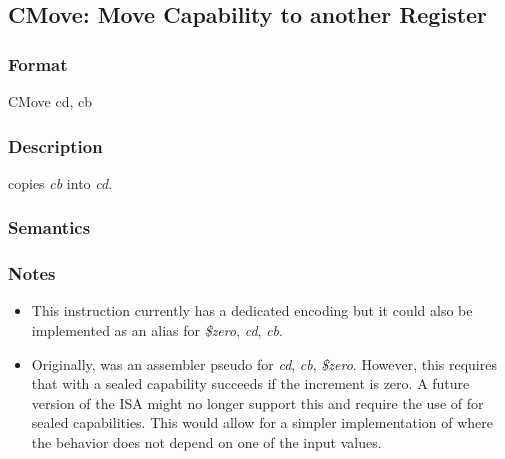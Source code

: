 \clearpage
{}
{}
\subsection*{CMove: Move Capability to another Register}

\subsubsection*{Format}

CMove cd, cb

\begin{center}
\end{center}

\subsubsection*{Description}

 copies \emph{cb} into \emph{cd}.

\subsubsection*{Semantics}


\subsubsection*{Notes}

\begin{itemize}
\item This instruction currently has a dedicated encoding but it could also be implemented as an alias for  \emph{\$zero}, \emph{cd}, \emph{cb}. 
\item Originally,  was an assembler pseudo for  \emph{cd}, \emph{cb}, \emph{\$zero}.
However, this requires that  with a sealed capability succeeds if the increment is zero.
A future version of the ISA might no longer support this and require the use of  for sealed capabilities.
This would allow for a simpler implementation of  where the behavior does not depend on one of the input values. 
\end{itemize}
